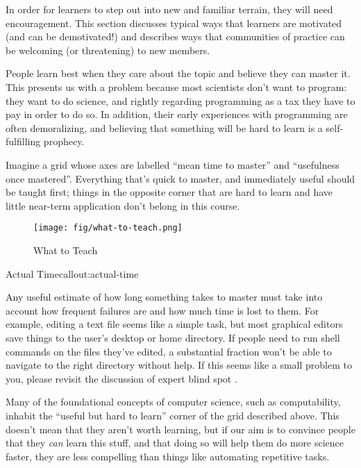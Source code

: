 
In order for learners to step out into new and familiar terrain, they
will need encouragement. This section discusses typical ways that
learners are motivated (and can be demotivated!) and describes ways that
communities of practice can be welcoming (or threatening) to new
members.


People learn best when they care about the topic and believe they can
master it. This presents us with a problem because most scientists don't
want to program: they want to do science, and rightly regarding
programming as a tax they have to pay in order to do so. In addition,
their early experiences with programming are often demoralizing, and
believing that something will be hard to learn is a self-fulfilling
prophecy.

Imagine a grid whose axes are labelled ``mean time to master'' and
``usefulness once mastered''. Everything that's quick to master, and
immediately useful should be taught first; things in the opposite corner
that are hard to learn and have little near-term application don't
belong in this course.

\begin{figure}[htbp]
\centering
\texttt{[image: fig/what-to-teach.png]}
\caption{What to Teach}
\end{figure}

\begin{callout}{Actual Time}{callout:actual-time}

Any useful estimate of how long something takes to master must take into
account how frequent failures are and how much time is lost to them. For
example, editing a text file seems like a simple task, but most
graphical editors save things to the user's desktop or home directory.
If people need to run shell commands on the files they've edited, a
substantial fraction won't be able to navigate to the right directory
without help. If this seems like a small problem to you, please revisit
the discussion of expert blind spot .
\end{callout}

Many of the foundational concepts of computer science, such as
computability, inhabit the ``useful but hard to learn'' corner of the
grid described above. This doesn't mean that they aren't worth learning,
but if our aim is to convince people that they \emph{can} learn this
stuff, and that doing so will help them do more science faster, they are
less compelling than things like automating repetitive tasks.

